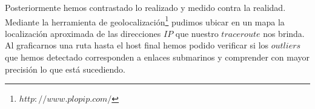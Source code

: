 Posteriormente hemos contrastado lo realizado y medido contra la realidad. 
Mediante la herramienta de geolocalización\footnote{$http://www.plopip.com/$} 
pudimos ubicar en un mapa la localización aproximada de las direcciones $IP$ que nuestro $traceroute$ nos brinda. 
Al graficarnos una ruta hasta el host final hemos podido verificar si los $outliers$ que hemos detectado corresponden a 
enlaces submarinos y comprender con mayor precisión lo que está sucediendo.


